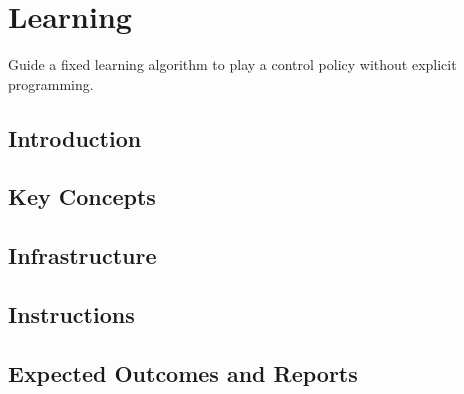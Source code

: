 

\chapter{Learning}
\label{sec:learning}

Guide a fixed learning algorithm to play a control policy without explicit programming.

\section{Introduction}

\section{Key Concepts}

\section{Infrastructure}

\section{Instructions}

\section{Expected Outcomes and Reports}

\newpage
